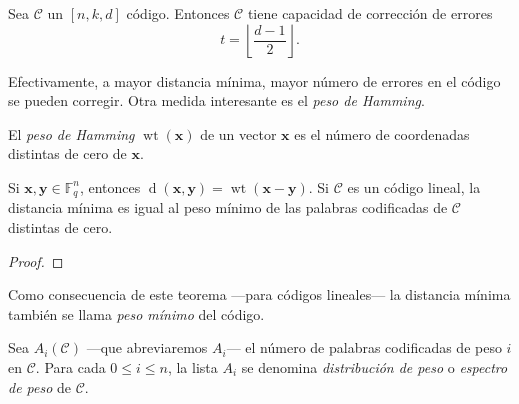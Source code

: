 \begin{theorem}
  Sea \(\mathcal C\) un \([n, k, d]\) código. Entonces \(\mathcal C\) tiene capacidad de corrección de errores \[
    t = \left\lfloor \frac{d - 1}{2} \right\rfloor.
  \]
\end{theorem}


Efectivamente, a mayor distancia mínima, mayor número de errores en el código se pueden corregir.
Otra medida interesante es el \textit{peso de Hamming}.

\begin{definition}
  El \textit{peso de Hamming} \(\operatorname{wt}(\symbf{x})\) de un vector \(\symbf{x}\) es el número de coordenadas distintas de cero de \(\symbf{x}\).
\end{definition}

\begin{theorem}
  Si \(\symbf{x}, \symbf{y} \in \mathbb F_q^n\), entonces \(\operatorname{d}(\symbf{x}, \symbf{y}) = \operatorname{wt}(\symbf{x} - \symbf{y})\).
  Si \(\mathcal C\) es un código lineal, la distancia mínima es igual al peso mínimo de las palabras codificadas de \(\mathcal C\) distintas de cero.
\end{theorem}

\begin{proof}
  
\end{proof}

Como consecuencia de este teorema —para códigos lineales— la distancia mínima también se llama \textit{peso mínimo} del código.

\begin{definition}
  Sea \(A_i(\mathcal C)\) —que abreviaremos \(A_i\)— el número de palabras codificadas de peso \(i\) en \(\mathcal C\).
  Para cada \(0 \leq i \leq n\), la lista \(A_i\) se denomina \textit{distribución de peso} o \textit{espectro de peso} de \(\mathcal C\).
\end{definition}

